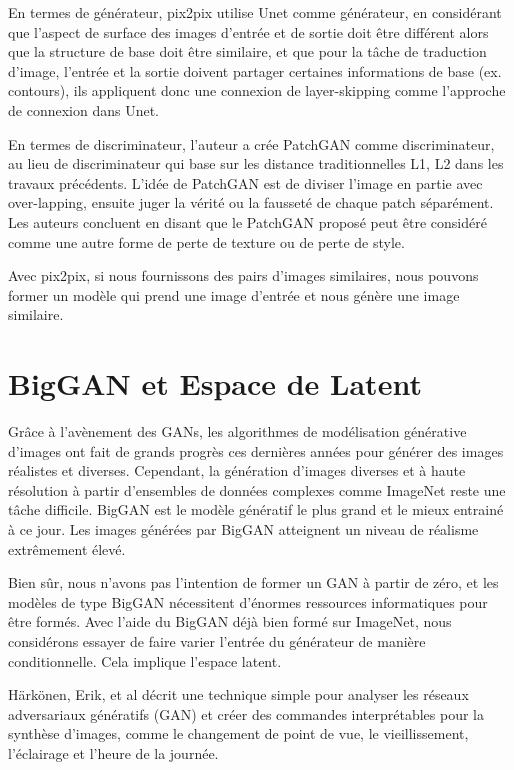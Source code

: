 En termes de générateur, pix2pix utilise Unet comme générateur, en considérant que l'aspect de surface des images d'entrée et de sortie doit être différent alors que la structure de base doit être similaire, et que pour la tâche de traduction d'image, l'entrée et la sortie doivent partager certaines informations de base (ex. contours), ils appliquent donc une connexion de layer-skipping comme l'approche de connexion dans Unet.

En termes de discriminateur, l'auteur a crée PatchGAN comme discriminateur, au lieu de  discriminateur qui base sur les distance traditionnelles L1, L2 dans les travaux précédents. L'idée de PatchGAN est de diviser l'image en partie avec over-lapping, ensuite juger la vérité ou la fausseté de chaque patch séparément. Les auteurs concluent en disant que le PatchGAN proposé peut être considéré comme une autre forme de perte de texture ou de perte de style.

Avec pix2pix, si nous fournissons des pairs d'images similaires, nous pouvons former un modèle qui prend une image d'entrée et nous génère une image similaire.


\section{BigGAN et Espace de Latent}

Grâce à l'avènement des GANs, les algorithmes de modélisation générative d'images ont fait de grands progrès ces dernières années pour générer des images réalistes et diverses. Cependant, la génération d'images diverses et à haute résolution à partir d'ensembles de données complexes comme ImageNet reste une tâche difficile. BigGAN est le modèle génératif le plus grand et le mieux entrainé à ce jour. Les images générées par BigGAN atteignent un niveau de réalisme extrêmement élevé. \cite{brock2018large}

Bien sûr, nous n'avons pas l'intention de former un GAN à partir de zéro, et les modèles de type BigGAN nécessitent d'énormes ressources informatiques pour être formés. Avec l'aide du BigGAN déjà bien formé sur ImageNet, nous considérons essayer de faire varier l'entrée du générateur de manière conditionnelle. Cela implique l'espace latent.

Härkönen, Erik, et al\cite{harkonen2020ganspace} décrit une technique simple pour analyser les réseaux adversariaux génératifs (GAN) et créer des commandes interprétables pour la synthèse d'images, comme le changement de point de vue, le vieillissement, l'éclairage et l'heure de la journée.



